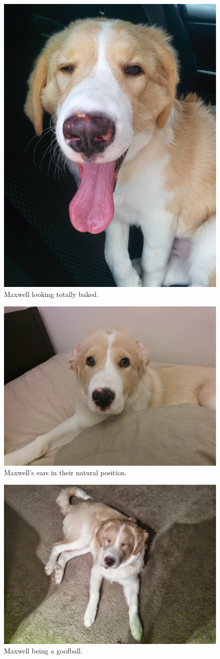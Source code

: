 \documentclass[pdftex,12pt]{article}
\begin{document}
\bigskip

\begin{figure}[H]
    \centering
    \includegraphics[width=.35\textwidth]{./images/max/totally_baked.jpg}
    \caption{Maxwell looking totally baked.}
    \label{fig:totally_baked}
\end{figure}

\begin{figure}[H]
    \centering
    \includegraphics[width=.35\textwidth]{./images/max/natural_ears.jpg}
    \caption{Maxwell's ears in their natural position.}
    \label{fig:natural_ears}
\end{figure}

\begin{figure}[H]
    \centering
    \includegraphics[width=.35\textwidth]{./images/max/goofball.jpg}
    \caption{Maxwell being a goofball.}
    \label{fig:goofball}
\end{figure}

\newpage
\listoftodos
\end{document}
